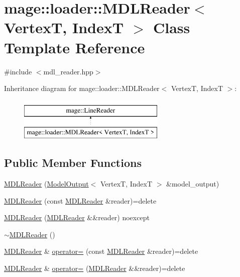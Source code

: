 \hypertarget{classmage_1_1loader_1_1_m_d_l_reader}{}\section{mage\+:\+:loader\+:\+:M\+D\+L\+Reader$<$ VertexT, IndexT $>$ Class Template Reference}
\label{classmage_1_1loader_1_1_m_d_l_reader}


{\ttfamily \#include $<$mdl\+\_\+reader.\+hpp$>$}

Inheritance diagram for mage\+:\+:loader\+:\+:M\+D\+L\+Reader$<$ VertexT, IndexT $>$\+:\begin{figure}[H]
\begin{center}
\leavevmode
\includegraphics[height=2.000000cm]{classmage_1_1loader_1_1_m_d_l_reader}
\end{center}
\end{figure}
\subsection*{Public Member Functions}
\begin{DoxyCompactItemize}
\item 
\hyperlink{classmage_1_1loader_1_1_m_d_l_reader_add63da01957e6a3a9b9ba38dbab70e11}{M\+D\+L\+Reader} (\hyperlink{structmage_1_1_model_output}{Model\+Output}$<$ VertexT, IndexT $>$ \&model\+\_\+output)
\item 
\hyperlink{classmage_1_1loader_1_1_m_d_l_reader_ae61041f898326f33e39391feed84114a}{M\+D\+L\+Reader} (const \hyperlink{classmage_1_1loader_1_1_m_d_l_reader}{M\+D\+L\+Reader} \&reader)=delete
\item 
\hyperlink{classmage_1_1loader_1_1_m_d_l_reader_a807457ff831a678f6fa20de8490d3d43}{M\+D\+L\+Reader} (\hyperlink{classmage_1_1loader_1_1_m_d_l_reader}{M\+D\+L\+Reader} \&\&reader) noexcept
\item 
\hyperlink{classmage_1_1loader_1_1_m_d_l_reader_af42e18c59fe48c3ad61362edcd955939}{$\sim$\+M\+D\+L\+Reader} ()
\item 
\hyperlink{classmage_1_1loader_1_1_m_d_l_reader}{M\+D\+L\+Reader} \& \hyperlink{classmage_1_1loader_1_1_m_d_l_reader_ae5198668e854659b2187fac3a5717451}{operator=} (const \hyperlink{classmage_1_1loader_1_1_m_d_l_reader}{M\+D\+L\+Reader} \&reader)=delete
\item 
\hyperlink{classmage_1_1loader_1_1_m_d_l_reader}{M\+D\+L\+Reader} \& \hyperlink{classmage_1_1loader_1_1_m_d_l_reader_a2cfae929a5bbd8100a81c25ca36de68c}{operator=} (\hyperlink{classmage_1_1loader_1_1_m_d_l_reader}{M\+D\+L\+Reader} \&\&reader)=delete
\end{DoxyCompactItemize}
